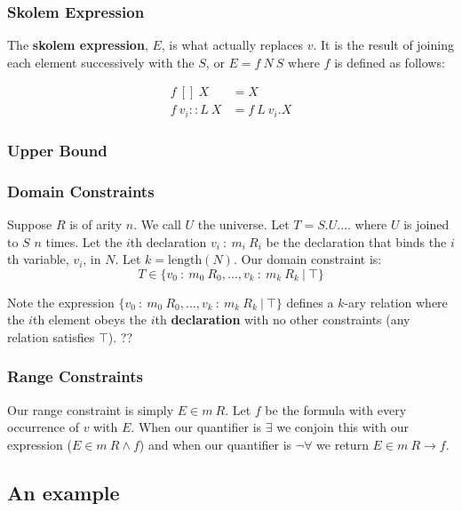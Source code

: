\documentclass{article}
\theoremstyle{definition}
\begin{document}
    \subsubsection*{Skolem Expression}

    The \textbf{skolem expression}, $E$, is what actually replaces $v$. It is the result of joining each element successively with the $S$, or $E = f~N~S$ where $f$ is defined as follows:
    
    \begin{align*}
        f~[]~X& = X\\
        f~v_i::L~X& = f~L~v_i.X
    \end{align*}

    \subsubsection*{Upper Bound}

    \subsubsection*{Domain Constraints}

    Suppose $R$ is of arity $n$. We call $U$ the universe. Let $T = S.U.\dots$ where $U$ is joined to $S$ $n$ times. Let the $i$th declaration $v_i~:~m_i~R_i$ be the declaration that binds the $i$th variable, $v_i$, in $N$. Let $k = \text{length}(N)$. Our domain constraint is:
    $$T \in \{v_0~:~m_0~R_0, \dots, v_k~:~m_k~R_k~\vert~\top\}$$

    Note the expression $\{v_0~:~m_0~R_0, \dots, v_k~:~m_k~R_k~\vert~\top\}$ defines a $k$-ary relation where the $i$th element obeys the $i$th \textbf{declaration} with no other constraints (any relation satisfies $\top$). ??



    \subsubsection*{Range Constraints}

    Our range constraint is simply $E \in m~R$. Let $f$ be the formula with every occurrence of $v$ with $E$. When our quantifier is $\exists$ we conjoin this with our expression ($E \in m~R \land f$) and when our quantifier is $\neg \forall$ we return $E \in m~R \to f$.

    \subsection{An example}

  
\end{document}
